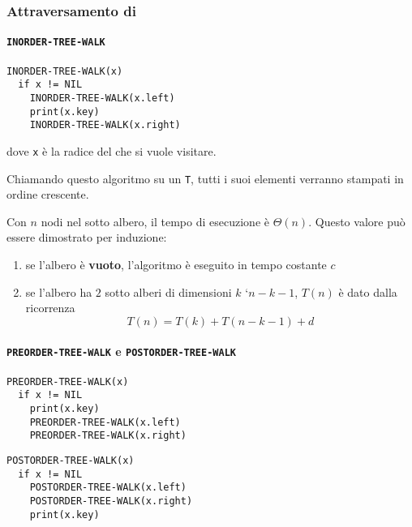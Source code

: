 \documentclass[italian, 10pt]{article}
\begin{document}
\subsubsection{Attraversamento di \BST}

\paragraph{\texttt{INORDER-TREE-WALK} }

\begin{lstlisting}[float, style=pseudocode, caption={Attraversamento di un BST in modo simmetrico}, label={lst:attraversamento-bst-inorder}]
INORDER-TREE-WALK(x)
  if x != NIL
    INORDER-TREE-WALK(x.left)
    print(x.key)
    INORDER-TREE-WALK(x.right)
\end{lstlisting}

dove \texttt{x} è la radice del \BST che si vuole visitare.

\bigskip
Chiamando questo algoritmo su un \BST \texttt{T}, tutti i suoi elementi verranno stampati in ordine crescente.

Con \(n\) nodi nel sotto albero, il tempo di esecuzione è \(\Theta(n)\).
Questo valore può essere dimostrato per induzione:

\begin{enumerate}
  \item se l'albero è \textbf{vuoto}, l'algoritmo è eseguito in tempo costante \(c\)
  \item se l'albero ha \(2\) sotto alberi di dimensioni \(k\) `\(n - k - 1\), \(T(n)\) è dato dalla ricorrenza
        \[ T(n) = T(k) + T(n - k - 1) + d \]
\end{enumerate}

\paragraph{\texttt{PREORDER-TREE-WALK} e \texttt{POSTORDER-TREE-WALK}}

\begin{minipage}[t]{0.495\textwidth}
  \begin{lstlisting}[style=pseudocode, caption={Attraversamento di un BST in modo anticipato}, label={lst:attraversamento-bst-preorder}]
PREORDER-TREE-WALK(x)
  if x != NIL
    print(x.key)
    PREORDER-TREE-WALK(x.left)
    PREORDER-TREE-WALK(x.right)
  \end{lstlisting}
\end{minipage}
\begin{minipage}[t]{0.495\textwidth}
  \begin{lstlisting}[style=pseudocode, caption={Attraversamento di un BST in modo posticipato}, label={lst:attraversamento-bst-postorder}]
POSTORDER-TREE-WALK(x)
  if x != NIL
    POSTORDER-TREE-WALK(x.left)
    POSTORDER-TREE-WALK(x.right)
    print(x.key)
    \end{lstlisting}
\end{minipage}
\end{document}
